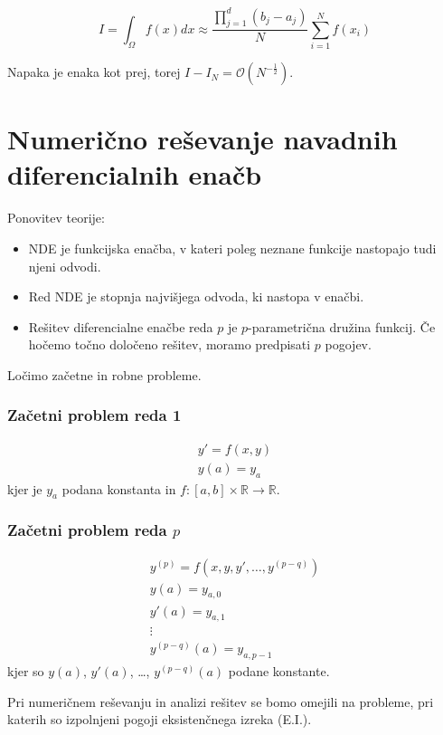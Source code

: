 \documentclass[a4paper,12pt]{article}
\theoremstyle{definition}
\theoremstyle{remark}
\newcommand{\R}{\mathbb{R}}
\begin{document}
\begin{equation*}
    I = \int_{\Omega} f(x) dx \approx \frac{\prod_{j=1}^{d} (b_j - a_j)}{N} \sum_{i=1}^{N} f(x_i)
\end{equation*}

Napaka je enaka kot prej, torej $I - I_N = \mathcal{O}(N^{-\frac{1}{2}})$.

\section{Numerično reševanje navadnih diferencialnih enačb}

Ponovitev teorije:
\begin{itemize}
    \item NDE je funkcijska enačba, v kateri poleg neznane funkcije nastopajo tudi njeni odvodi.
    \item Red NDE je stopnja najvišjega odvoda, ki nastopa v enačbi.
    \item Rešitev diferencialne enačbe reda $p$ je $p$-parametrična družina funkcij. Če hočemo točno določeno rešitev, moramo predpisati $p$ pogojev.
\end{itemize}

Ločimo začetne in robne probleme.

\subsubsection{Začetni problem reda 1}

\begin{gather*}
    y' = f(x, y) \\
    y(a) = y_a
\end{gather*}
kjer je $y_a$ podana konstanta in $f: [a, b] \times \R \to \R$.

\subsubsection{Začetni problem reda $p$}
\begin{gather*}
    y^{(p)} = f(x, y, y', \dots, y^{(p-q)}) \\
    y(a) = y_{a, 0} \\
    y'(a) = y_{a, 1} \\
    \vdots \\
    y^{(p-q)}(a) = y_{a, p-1}
\end{gather*}
kjer so $y(a)$, $y'(a)$, \dots, $y^{(p-q)}(a)$ podane konstante.

Pri numeričnem reševanju in analizi rešitev se bomo omejili na probleme, pri katerih so izpolnjeni pogoji eksistenčnega izreka (E.I.).
\end{document}
